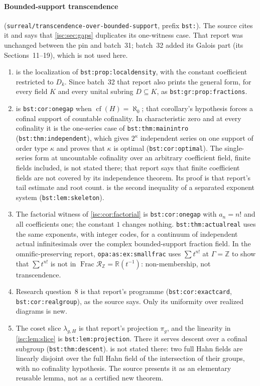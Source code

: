 \documentclass[11pt,letterpaper]{article}
\theoremstyle{definition}
\theoremstyle{remark}
\newcommand{\R}{\mathbb R}
\newcommand{\Z}{\mathbb Z}
\newcommand{\Frac}{\operatorname{Frac}}
\newcommand{\cf}{\operatorname{cf}}
\newcommand{\rpath}[1]{\nolinkurl{#1}}%
\newcommand{\lbl}[1]{\nolinkurl{#1}}%
\numberwithin{equation}{section}
\begin{document}
\paragraph{Bounded-support transcendence}
(\rpath{surreal/transcendence-over-bounded-support}, prefix \texttt{bst:}).
The source cites it and says that \cref{isc:sec:gaps} duplicates its
one-witness case. That report was unchanged between the pin and batch~31;
batch~32 added its Galois part (its Sections~11--19), which is not used here.
\begin{enumerate}[leftmargin=*,itemsep=3pt]
\item {} is the localization of
\lbl{bst:prop:localdensity}, with the constant coefficient restricted to
$D_k$. Since batch~32 that report also prints the general form, for every
field $K$ and every unital subring $D\subseteq K$, as
\lbl{bst:gr:prop:fractions}.
\item {} is \lbl{bst:cor:onegap} when
$\cf(H)=\aleph_0$; that corollary's hypothesis forces a cofinal support of
countable cofinality. In characteristic zero and at every cofinality it is
the one-series case of \lbl{bst:thm:mainintro} (\lbl{bst:thm:independent}),
which gives $2^\kappa$ independent series on one support of order type
$\kappa$ and proves that $\kappa$ is optimal (\lbl{bst:cor:optimal}). The
single-series form at uncountable cofinality over an arbitrary coefficient
field, finite fields included, is not stated there; that report says that
finite coefficient fields are not covered by its independence theorem. Its
proof is that report's tail estimate and root count.
 is the second inequality of a separated exponent
system (\lbl{bst:lem:skeleton}).
\item The factorial witness of \cref{isc:cor:factorial} is
\lbl{bst:cor:onegap} with $a_n=n!$ and all coefficients one; the constant
$1$ changes nothing. \lbl{bst:thm:actualreal} uses the same exponents, with
integer codes, for a continuum of independent actual infinitesimals over the
complex bounded-support fraction field. In the omnific-preserving report,
\lbl{opa:as:ex:smallfrac} uses $\sum t^{n!}$ at $\Gamma=\Z$ to show that
$\sum t^{n!}$ is not in $\Frac\mathcal R_\Z=\R(t^{-1})$: non-membership,
not transcendence.
\item Research question~8 is that report's programme
(\lbl{bst:cor:exactcard}, \lbl{bst:cor:realgroup}), as the source says.
Only its uniformity over realized diagrams is new.
\item The coset slice $\lambda_{g,H}$ is that report's projection $\pi_g$,
and the linearity in \cref{isc:lem:slice} is \lbl{bst:lem:projection}.
There it serves descent over a cofinal subgroup
(\lbl{bst:thm:descent}).  is not stated there:
two full Hahn fields are linearly disjoint over the full Hahn field of the
intersection of their groups, with no cofinality hypothesis. The source
presents it as an elementary reusable lemma, not as a certified new theorem.
\end{enumerate}
\end{document}
